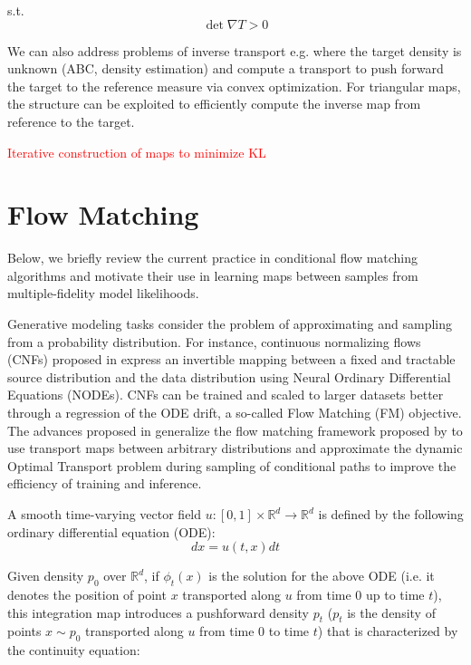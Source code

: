 \documentclass[12pt]{article}
\renewcommand{\[}{\left[}
\renewcommand{\]}{\right]}
\renewcommand{\(}{\left(}
\renewcommand{\)}{\right)}
\newcommand{\RR}{\mathbb{R}}
\begin{document}
s.t. $$\det \nabla T > 0$$

We can also address problems of inverse transport e.g. where the target density is unknown (ABC, density estimation) and compute a transport to push forward the target to the reference measure via convex optimization. For triangular maps, the structure can be exploited to efficiently compute the inverse map from reference to the target.

\textcolor{red}{Iterative construction of maps to minimize KL}

\section{Flow Matching}

Below, we briefly review the current practice in conditional flow matching algorithms and motivate their use in learning maps between samples from multiple-fidelity model likelihoods.

Generative modeling tasks consider the problem of approximating and sampling from a probability distribution. For instance, continuous normalizing flows (CNFs) proposed in \cite{grathwohl_ffjord_2018} express an invertible mapping between a fixed and tractable source distribution and the data distribution using Neural Ordinary Differential Equations (NODEs). CNFs can be trained and scaled to larger datasets better through a regression of the ODE drift, a so-called Flow Matching (FM) objective. The advances proposed in \cite{tong_improving_2024} generalize the flow matching framework proposed by \cite{lipman_flow_2023} to use transport maps between arbitrary distributions and approximate the dynamic Optimal Transport problem during sampling of conditional paths to improve the efficiency of training and inference. 

A smooth time-varying vector field $u: [0, 1] \times \RR^d \to \RR^d$ is defined by the following ordinary differential equation (ODE):
\begin{equation}
    dx = u(t, x)dt
\end{equation}

Given density $p_0$ over $\RR^d$, if $\phi_t(x)$ is the solution for the above ODE (i.e. it denotes the position of point $x$ transported along $u$ from time $0$ up to time $t$), this integration map introduces a pushforward density $p_t$ ($p_t$ is the density of points $x \sim p_0$ transported along $u$ from time 0 to time $t$) that is characterized by the continuity equation:
\end{document}
